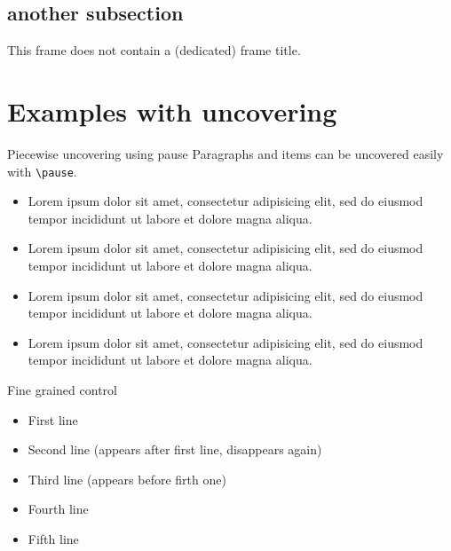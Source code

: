 \documentclass[10pt, aspectratio=1610]{beamer}
\begin{document}
\subsection{another subsection}

\begin{frame}
	This frame does not contain a (dedicated) frame title.
\end{frame}

\section{Examples with uncovering}

\begin{frame}{Piecewise uncovering using pause}
	Paragraphs and items can be uncovered easily with \texttt{\textbackslash pause}.
	\pause
	\begin{itemize}
		\item Lorem ipsum dolor sit amet, consectetur adipisicing elit, sed do eiusmod tempor incididunt ut labore et dolore magna aliqua. 
			\pause
		\item Lorem ipsum dolor sit amet, consectetur adipisicing elit, sed do eiusmod tempor incididunt ut labore et dolore magna aliqua. 
			\pause
		\item Lorem ipsum dolor sit amet, consectetur adipisicing elit, sed do eiusmod tempor incididunt ut labore et dolore magna aliqua. 
			\pause
		\item Lorem ipsum dolor sit amet, consectetur adipisicing elit, sed do eiusmod tempor incididunt ut labore et dolore magna aliqua. 
	\end{itemize}
\end{frame}

\begin{frame}{Fine grained control}
	\begin{itemize}
		\item<1-> First line
		\item<2>  Second line (appears after first line, disappears again)
		\item<3-4> Third line (appears before firth one)
		\item<4-> Fourth line
		\item<5-> Fifth line
	\end{itemize}

\end{frame}
\end{document}
